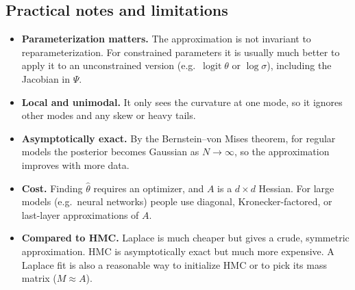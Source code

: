 \documentclass[11pt]{article}
\begin{document}
\subsection{Practical notes and limitations}
\begin{itemize}
    \item \textbf{Parameterization matters.} The approximation is not invariant to reparameterization. For constrained parameters it is usually much better to apply it to an unconstrained version (e.g.\ $\operatorname{logit}\theta$ or $\log\sigma$), including the Jacobian in $\Psi$.
    \item \textbf{Local and unimodal.} It only sees the curvature at one mode, so it ignores other modes and any skew or heavy tails.
    \item \textbf{Asymptotically exact.} By the Bernstein--von Mises theorem, for regular models the posterior becomes Gaussian as $N \to \infty$, so the approximation improves with more data.
    \item \textbf{Cost.} Finding $\hat\theta$ requires an optimizer, and $A$ is a $d \times d$ Hessian. For large models (e.g.\ neural networks) people use diagonal, Kronecker-factored, or last-layer approximations of $A$.
    \item \textbf{Compared to HMC.} Laplace is much cheaper but gives a crude, symmetric approximation. HMC is asymptotically exact but much more expensive. A Laplace fit is also a reasonable way to initialize HMC or to pick its mass matrix ($M \approx A$).
\end{itemize}
\end{document}
